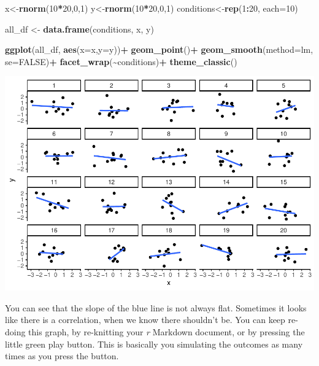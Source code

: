 \documentclass[
]{book}
\newenvironment{Shaded}{\begin{snugshade}}{\end{snugshade}}
\newcommand{\AttributeTok}[1]{\textcolor[rgb]{0.13,0.29,0.53}{#1}}
\newcommand{\ConstantTok}[1]{\textcolor[rgb]{0.56,0.35,0.01}{#1}}
\newcommand{\DecValTok}[1]{\textcolor[rgb]{0.00,0.00,0.81}{#1}}
\newcommand{\FunctionTok}[1]{\textcolor[rgb]{0.13,0.29,0.53}{\textbf{#1}}}
\newcommand{\NormalTok}[1]{#1}
\newcommand{\OtherTok}[1]{\textcolor[rgb]{0.56,0.35,0.01}{#1}}
\newcommand{\SpecialCharTok}[1]{\textcolor[rgb]{0.81,0.36,0.00}{\textbf{#1}}}
\begin{document}
\begin{Shaded}
\begin{Highlighting}[]
\NormalTok{x}\OtherTok{\textless{}{-}}\FunctionTok{rnorm}\NormalTok{(}\DecValTok{10}\SpecialCharTok{*}\DecValTok{20}\NormalTok{,}\DecValTok{0}\NormalTok{,}\DecValTok{1}\NormalTok{)}
\NormalTok{y}\OtherTok{\textless{}{-}}\FunctionTok{rnorm}\NormalTok{(}\DecValTok{10}\SpecialCharTok{*}\DecValTok{20}\NormalTok{,}\DecValTok{0}\NormalTok{,}\DecValTok{1}\NormalTok{)}
\NormalTok{conditions}\OtherTok{\textless{}{-}}\FunctionTok{rep}\NormalTok{(}\DecValTok{1}\SpecialCharTok{:}\DecValTok{20}\NormalTok{, }\AttributeTok{each=}\DecValTok{10}\NormalTok{)}

\NormalTok{all\_df }\OtherTok{\textless{}{-}} \FunctionTok{data.frame}\NormalTok{(conditions, x, y)}

\FunctionTok{ggplot}\NormalTok{(all\_df, }\FunctionTok{aes}\NormalTok{(}\AttributeTok{x=}\NormalTok{x,}\AttributeTok{y=}\NormalTok{y))}\SpecialCharTok{+}
  \FunctionTok{geom\_point}\NormalTok{()}\SpecialCharTok{+}
  \FunctionTok{geom\_smooth}\NormalTok{(}\AttributeTok{method=}\NormalTok{lm, }\AttributeTok{se=}\ConstantTok{FALSE}\NormalTok{)}\SpecialCharTok{+}
  \FunctionTok{facet\_wrap}\NormalTok{(}\SpecialCharTok{\textasciitilde{}}\NormalTok{conditions)}\SpecialCharTok{+}
  \FunctionTok{theme\_classic}\NormalTok{()}
\end{Highlighting}
\end{Shaded}

\includegraphics{Statistics_Lab_files/figure-latex/unnamed-chunk-284-1.pdf}

You can see that the slope of the blue line is not always flat. Sometimes it looks like there is a correlation, when we know there shouldn't be. You can keep re-doing this graph, by re-knitting your \emph{r} Markdown document, or by pressing the little green play button. This is basically you simulating the outcomes as many times as you press the button.
\end{document}

